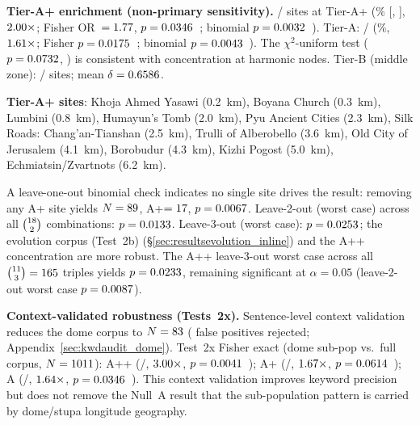 \textbf{Tier-A+ enrichment (non-primary sensitivity).}
\NcircTierAp/\NcircTotal{} sites at Tier-A+
(\NcircApRate\% [\circApCIlo, \circApCIhi], $2.00\times$;
Fisher OR~$= 1.77$, $p = 0.0346$~\pCircApFisherSig{};
binomial $p = 0.0032$~\pCircApSig{}).
Tier-A: \NcircTierA/\NcircTotal{} (\circARate\%, $1.61\times$;
Fisher $p = 0.0175$~\pCircAFisherSig{};
binomial $p = 0.0043$~\pCircASig{}).
The $\chi^2$-uniform test ($p = 0.0732$, \pCircChiSig{}) is consistent with
concentration at harmonic nodes.
Tier-B (middle zone): \NcircTierB/\NcircTotal{} sites;
mean $\delta = 0.6586$\textdegree{}.

\noindent\textbf{Tier-A+ sites}:
Khoja Ahmed Yasawi (0.2~km),
Boyana Church (0.3~km),
Lumbini (0.8~km),
Humayun's Tomb (2.0~km),
Pyu Ancient Cities (2.3~km),
Silk Roads: Chang'an-Tianshan (2.5~km), Trulli of Alberobello (3.6~km),
Old City of Jerusalem (4.1~km),
Borobudur (4.3~km),
Kizhi Pogost (5.0~km), Echmiatsin/Zvartnots (6.2~km).

A leave-one-out binomial check indicates no single site drives the result:
removing any A+ site yields $N = 89$, A+$= 17$,
$p = 0.0067$.
Leave-2-out (worst case) across all $\binom{18}{2}$ combinations:
$p = 0.0133$.
Leave-3-out (worst case): $p = 0.0253$; the evolution corpus (Test~2b) (\S\ref{sec:resultsevolution_inline}) 
and the A++ concentration are more robust. 
The A++ leave-3-out worst case across all
$\binom{11}{3} = 165$ triples yields
$p = 0.0233$, remaining significant at $\alpha = 0.05$
(leave-2-out worst case $p = 0.0087$).

\textbf{Context-validated robustness (Tests~2x).}
Sentence-level context validation reduces the dome corpus to $N = 83$
(\NcircContextRejected{} false positives rejected; Appendix~\ref{sec:kwdaudit_dome}).
Test~2x Fisher exact (dome sub-pop vs.\ full corpus, $N = 1011$):
A++ (\NcircValidatedApp/\NcircValidated, $3.00\times$,
$p = 0.0041$~\pCircAppValidatedFisherSig{});
A+ (\NcircValidatedAp/\NcircValidated, $1.67\times$,
$p = 0.0614$~\pCircApValidatedFisherSig{});
A (\NcircValidatedA/\NcircValidated, $1.64\times$,
$p = 0.0346$~\pCircAValidatedFisherSig{}).
This context validation improves keyword precision but does not remove
the Null~A result that the sub-population pattern is carried by
dome/stupa longitude geography.


